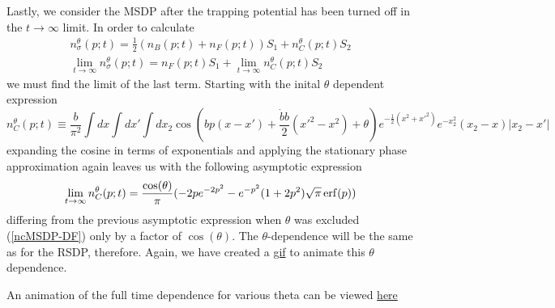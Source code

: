 \documentclass[onecolumn,english,aps,pra]{revtex4}
\begin{document}
Lastly, we consider the MSDP after the trapping potential has been turned off in the $t \rightarrow \infty$ limit. In order to calculate 
\begin{eqnarray}
n_\sigma^\theta(p;t) = \frac{1}{2}\left(n_B(p;t) + n_F(p;t)\right)
 S_1 + n_C^\theta(p;t)S_2\\
\lim_{t \rightarrow \infty} n_\sigma^\theta(p;t) = n_F(p;t)S_1 + \lim_{t \rightarrow \infty} n_C^\theta(p;t)S_2
\end{eqnarray}
we must find the limit of the last term. Starting with the inital $\theta$ dependent expression
\begin{equation}
n_C^\theta(p;t) \equiv \frac{b}{\pi^2} \int dx \int dx' \int dx_2  \cos(bp(x-x') + \frac{\dot{b}b}{2}(x'^2 - x^2) + \theta)
e^{-\frac{1}{2}(x^2 + x'^2)}e^{-x_2^2}(x_2 -x) |x_2 -x'|
\end{equation}
expanding the cosine in terms of exponentials and applying the stationary phase approximation again leaves us with the following asymptotic expression
\begin{equation}
\lim_{t\rightarrow \infty} n_C^\theta(p;t) = \frac{\cos(\theta)}{\pi}(-2pe^{-2p^2}-e^{-p^2}(1+2p^2)\sqrt{\pi}\erf(p))
\end{equation}
differing from the previous asymptotic expression when $\theta$ was excluded (\ref{ncMSDP-DF}) only by a factor of $\cos(\theta)$. The $\theta$-dependence will be the same as for the RSDP, therefore. Again, we have created a \href{https://github.com/TimSkaras/UltraColdAtoms/blob/master/Plots/ThetaEvolutionMSDP-DF.gif}{gif} to animate this $\theta$ dependence.

An animation of the full time dependence for various theta can be viewed \href{https://github.com/TimSkaras/UltraColdAtoms/tree/master/Plots/Time%20Evolution%20NSigma}{here}
\end{document}
